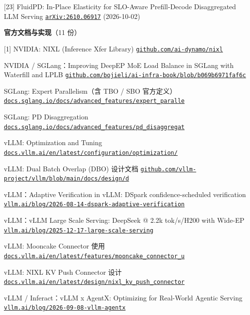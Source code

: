 [23] FluidPD: In-Place Elasticity for SLO-Aware Prefill-Decode Disaggregated LLM Serving \href{https://arxiv.org/abs/2610.06917}{\texttt{arXiv:2610.06917}} (2026-10-02)\par
\vspace{6pt}
\noindent\textbf{官方文档与实现}（11 份）\par
\vspace{2pt}
[1] NVIDIA: NIXL (Inference Xfer Library) \href{https://github.com/ai-dynamo/nixl}{\texttt{github.com/ai-dynamo/nixl}}\par
[2] NVIDIA / SGLang：Improving DeepEP MoE Load Balance in SGLang with Waterfill and LPLB \href{https://github.com/bojieli/ai-infra-book/blob/b069b6971faf6c4701b57a8b025462b9f2694b8f/references/framework-history/2026-09-08/ep-reconfiguration/sglang-waterfill-lplb-2026.md}{\texttt{github.com/bojieli/ai-infra-book/blob/b069b6971faf6c}}\par
[3] SGLang: Expert Parallelism（含 TBO / SBO 官方定义） \href{https://docs.sglang.io/docs/advanced_features/expert_parallelism}{\texttt{docs.sglang.io/docs/advanced\_features/expert\_paralle}}\par
[4] SGLang: PD Disaggregation \href{https://docs.sglang.io/docs/advanced_features/pd_disaggregation}{\texttt{docs.sglang.io/docs/advanced\_features/pd\_disaggregat}}\par
[5] vLLM: Optimization and Tuning \href{https://docs.vllm.ai/en/latest/configuration/optimization/}{\texttt{docs.vllm.ai/en/latest/configuration/optimization/}}\par
[6] vLLM: Dual Batch Overlap (DBO) 设计文档 \href{https://github.com/vllm-project/vllm/blob/main/docs/design/dbo.md}{\texttt{github.com/vllm-project/vllm/blob/main/docs/design/d}}\par
[7] vLLM：Adaptive Verification in vLLM: DSpark confidence-scheduled verification \href{https://vllm.ai/blog/2026-08-14-dspark-adaptive-verification}{\texttt{vllm.ai/blog/2026-08-14-dspark-adaptive-verification}}\par
[8] vLLM：vLLM Large Scale Serving: DeepSeek @ 2.2k tok/s/H200 with Wide-EP \href{https://vllm.ai/blog/2025-12-17-large-scale-serving}{\texttt{vllm.ai/blog/2025-12-17-large-scale-serving}}\par
[9] vLLM: Mooncake Connector 使用 \href{https://docs.vllm.ai/en/latest/features/mooncake_connector_usage/}{\texttt{docs.vllm.ai/en/latest/features/mooncake\_connector\_u}}\par
[10] vLLM: NIXL KV Push Connector 设计 \href{https://docs.vllm.ai/en/latest/design/nixl_kv_push_connector/}{\texttt{docs.vllm.ai/en/latest/design/nixl\_kv\_push\_connector}}\par
[11] vLLM / Inferact：vLLM x AgentX: Optimizing for Real-World Agentic Serving \href{https://vllm.ai/blog/2026-09-08-vllm-agentx}{\texttt{vllm.ai/blog/2026-09-08-vllm-agentx}}\par
\endgroup

